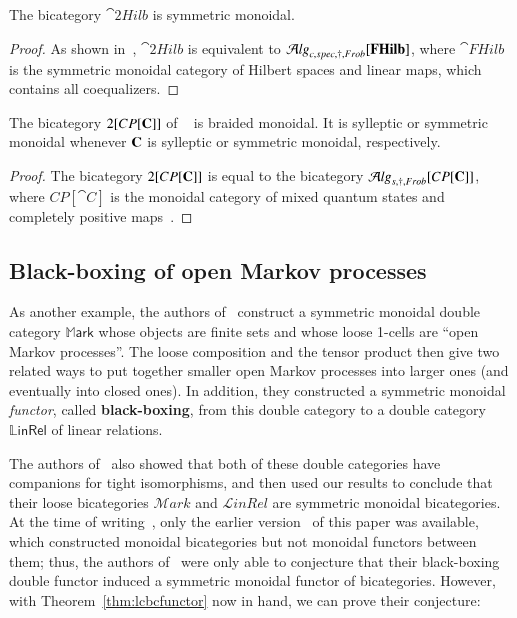 \begin{cor}
The bicategory $\cat{2Hilb}$ is symmetric monoidal.
\end{cor}

\begin{proof}
As shown in~\cite[Section 3.6.3]{westerthesis}, $\cat{2Hilb}$ is equivalent to $\mathcal{A}\mathit{lg}_{c,spec,\dagger, Frob}[\mathbf{FHilb}]$, where $\cat{FHilb}$ is the symmetric monoidal category of Hilbert spaces and linear maps, which contains all coequalizers.
\end{proof}


\begin{cor}
 The bicategory $2[CP[{\bf C}]]$ of ~\cite{heunenvicarywester} is braided monoidal. It is sylleptic or symmetric monoidal whenever ${\bf C}$ is sylleptic or symmetric monoidal, respectively.
\end{cor}

\begin{proof}
The bicategory $2[CP[{\bf C}]]$ is equal to the bicategory $\mathcal{A}\mathit{lg}_{s,\dagger, Frob}[CP[{\bf C}]]$, where $CP[\cat{C}]$ is the monoidal category of mixed quantum states and completely positive maps~\cite{chk:cqchannel}.
\end{proof}

\subsection*{Black-boxing of open Markov processes}
\label{sec:markov}

As another example, the authors of~\cite{bc:markov} construct a symmetric monoidal double category $\mathbb{M}\mathsf{ark}$ whose objects are finite sets and whose loose 1-cells are ``open Markov processes''.
The loose composition and the tensor product then give two related ways to put together smaller open Markov processes into larger ones (and eventually into closed ones).
In addition, they constructed a symmetric monoidal \emph{functor}, called \textbf{black-boxing}, from this double category to a double category $\mathbb{L}\mathsf{inRel}$ of linear relations.

The authors of~\cite{bc:markov} also showed that both of these double categories have companions for tight isomorphisms, and then used our results to conclude that their loose bicategories $\mathcal{M}\mathit{ark}$ and $\mathcal{L}\mathit{inRel}$ are symmetric monoidal bicategories.
At the time of writing~\cite{bc:markov}, only the earlier version~\cite{shulman:smbicat} of this paper was available, which constructed monoidal bicategories but not monoidal functors between them; thus, the authors of~\cite{bc:markov} were only able to conjecture that their black-boxing double functor induced a symmetric monoidal functor of bicategories.
However, with Theorem~\ref{thm:lcbcfunctor} now in hand, we can prove their conjecture:

